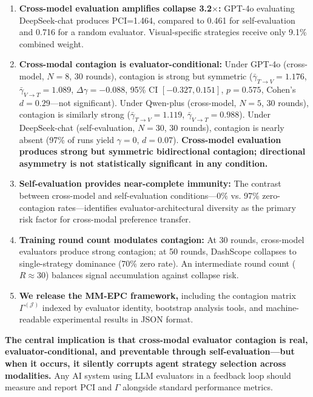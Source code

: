 \documentclass[11pt,a4paper]{article}
\begin{document}
\begin{enumerate}[leftmargin=*]
    \item \textbf{Cross-model evaluation amplifies collapse 3.2$\times$:} GPT-4o evaluating DeepSeek-chat produces PCI=1.464, compared to 0.461 for self-evaluation and 0.716 for a random evaluator. Visual-specific strategies receive only 9.1\% combined weight.
    \item \textbf{Cross-modal contagion is evaluator-conditional:} Under GPT-4o (cross-model, $N=8$, 30 rounds), contagion is strong but symmetric ($\bar{\gamma}_{T\to V}=1.176$, $\bar{\gamma}_{V\to T}=1.089$, $\Delta\gamma=-0.088$, 95\% CI $[-0.327,0.151]$, $p=0.575$, Cohen's $d=0.29$---not significant). Under Qwen-plus (cross-model, $N=5$, 30 rounds), contagion is similarly strong ($\bar{\gamma}_{T\to V}=1.119$, $\bar{\gamma}_{V\to T}=0.988$). Under DeepSeek-chat (self-evaluation, $N=30$, 30 rounds), contagion is nearly absent (97\% of runs yield $\gamma=0$, $d=0.07$). \textbf{Cross-model evaluation produces strong but symmetric bidirectional contagion; directional asymmetry is not statistically significant in any condition.}
    \item \textbf{Self-evaluation provides near-complete immunity:} The contrast between cross-model and self-evaluation conditions---0\% vs. 97\% zero-contagion rates---identifies evaluator-architectural diversity as the primary risk factor for cross-modal preference transfer.
    \item \textbf{Training round count modulates contagion:} At 30 rounds, cross-model evaluators produce strong contagion; at 50 rounds, DashScope collapses to single-strategy dominance (70\% zero rate). An intermediate round count ($R \approx 30$) balances signal accumulation against collapse risk.
    \item \textbf{We release the MM-EPC framework,} including the contagion matrix $\Gamma^{(\mathcal{J})}$ indexed by evaluator identity, bootstrap analysis tools, and machine-readable experimental results in JSON format.
\end{enumerate}

\textbf{The central implication is that cross-modal evaluator contagion is real, evaluator-conditional, and preventable through self-evaluation---but when it occurs, it silently corrupts agent strategy selection across modalities.} Any AI system using LLM evaluators in a feedback loop should measure and report PCI and $\Gamma$ alongside standard performance metrics.
\end{document}
